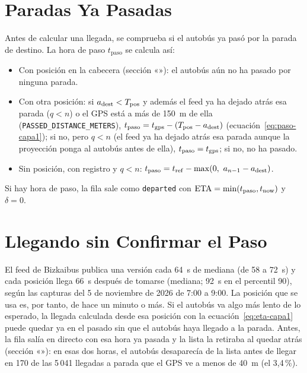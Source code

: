 \section{Paradas Ya Pasadas}
\label{sec:paso}

Antes de calcular una llegada, se comprueba si el autobús ya pasó por la parada de destino. La hora de paso
$t_{\mathrm{paso}}$ se calcula así:

\begin{itemize}
  \item Con posición en la cabecera (sección «»): el autobús aún no ha pasado por ninguna
        parada.
  \item Con otra posición: si $a_{\mathrm{dest}}<T_{\mathrm{pos}}$ y además el feed ya ha dejado atrás esa parada ($q<n$) o el GPS está a más
        de 150~m de ella (\texttt{PASSED\_DISTANCE\_METERS}), $t_{\mathrm{paso}}=t_{\mathrm{gps}}-(T_{\mathrm{pos}}-a_{\mathrm{dest}})$
        (ecuación~\eqref{eq:paso-capa1}); si no, pero $q<n$ (el feed ya ha dejado atrás esa parada aunque la proyección
        ponga al autobús antes de ella), $t_{\mathrm{paso}}=t_{\mathrm{gps}}$; si no, no ha pasado.
  \item Sin posición, con registro y $q<n$: $t_{\mathrm{paso}}=\tref-\max(0,\ a_{n-1}-a_\dest)$.
\end{itemize}

\noindent Si hay hora de paso, la fila sale como \texttt{departed} con $\mathrm{ETA}=\min(t_{\mathrm{paso}},t_{\mathrm{now}})$ y
$\delta=0$.

\section{Llegando sin Confirmar el Paso}
\label{sec:llegando}

El feed de Bizkaibus publica una versión cada 64~s de mediana (de 58 a 72~s) y cada posición llega 66~s después de
tomarse (mediana; 92~s en el percentil 90), según las capturas del 5 de noviembre de 2026 de 7:00 a 9:00. La posición
que se usa es, por tanto, de hace un minuto o más. Si el autobús va algo más lento de lo esperado, la llegada calculada
desde esa posición con la ecuación~\eqref{eq:eta-capa1} puede quedar ya en el pasado sin que el autobús haya llegado a
la parada. Antes, la fila salía en directo con esa hora ya pasada y la lista la retiraba al quedar atrás (sección
«»): en esas dos horas, el autobús desaparecía de la lista antes de llegar en 170 de las
5\,041 llegadas a parada que el GPS ve a menos de 40~m (el 3{,}4\,\%).

